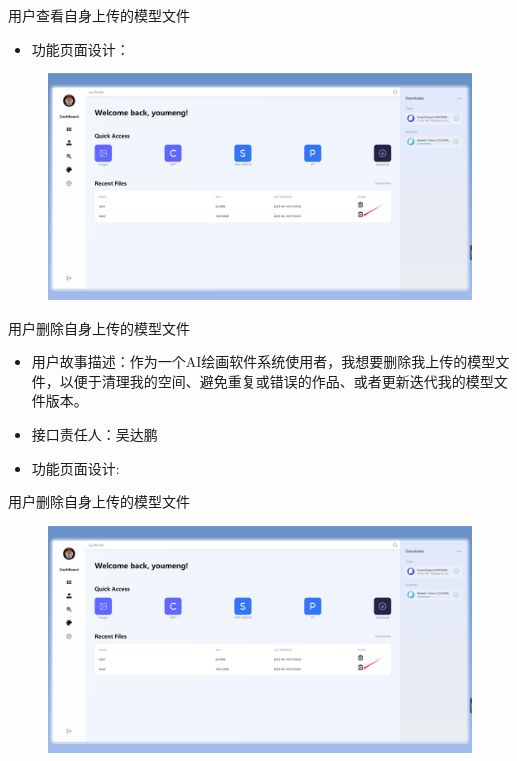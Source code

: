 \begin{frame}{用户查看自身上传的模型文件}
    \begin{itemize}
        \item 功能页面设计：
    \end{itemize}
    \begin{figure}[H]
        \centering
        \includegraphics[width=\textwidth]{contents/figure/remove_click.jpg}
    \end{figure}
\end{frame}

\begin{frame}{用户删除自身上传的模型文件}
    \begin{itemize}
        \item 用户故事描述：作为一个AI绘画软件系统使用者，我想要删除我上传的模型文件，以便于清理我的空间、避免重复或错误的作品、或者更新迭代我的模型文件版本。
        \item 接口责任人：吴达鹏
        \item 功能页面设计:
    \end{itemize}
\end{frame}

\begin{frame}{用户删除自身上传的模型文件}
    \begin{figure}[H]
        \centering
        \includegraphics[width=\textwidth]{contents/figure/remove_click.jpg}
    \end{figure}
\end{frame}

